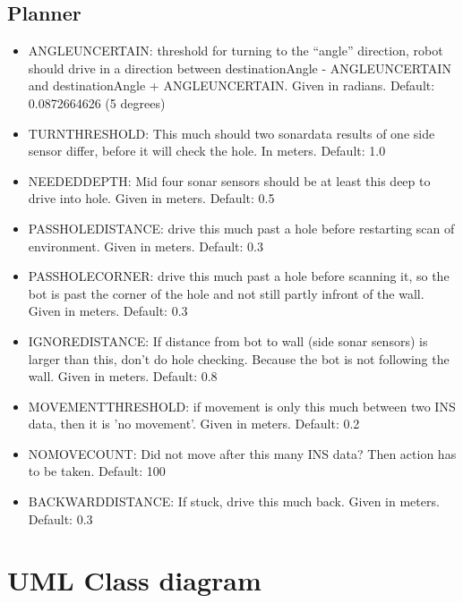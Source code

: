 \documentclass[titlepage, a4paper,10pt]{article}
\begin{document}
\subsection{Planner}
\begin{itemize}
\item ANGLEUNCERTAIN: threshold for turning to the ``angle'' direction, robot should drive in a direction between destinationAngle - ANGLEUNCERTAIN and destinationAngle + ANGLEUNCERTAIN. Given in radians. Default: 0.0872664626 (5 degrees)

\item TURNTHRESHOLD: This much should two sonardata results of one side sensor differ, before it will check the hole. In meters. Default: 1.0 

\item NEEDEDDEPTH: Mid four sonar sensors should be at least this deep to drive into hole. Given in meters. Default: 0.5

\item PASSHOLEDISTANCE: drive this much past a hole before restarting scan of environment. Given in meters. Default: 0.3

\item PASSHOLECORNER: drive this much past a hole before scanning it, so the bot is past the corner of the hole and not still partly infront of the wall. Given in meters. Default: 0.3

\item IGNOREDISTANCE: If distance from bot to wall (side sonar sensors) is larger than this, don't do hole checking. Because the bot is not following the wall. Given in meters. Default: 0.8

\item MOVEMENTTHRESHOLD: if movement is only this much between two INS data, then it is 'no movement'. Given in meters. Default: 0.2

\item NOMOVECOUNT: Did not move after this many INS data? Then action has to be taken. Default: 100

\item BACKWARDDISTANCE: If stuck, drive this much back. Given in meters. Default: 0.3

\end{itemize}
\section{UML Class diagram}

\end{document}
